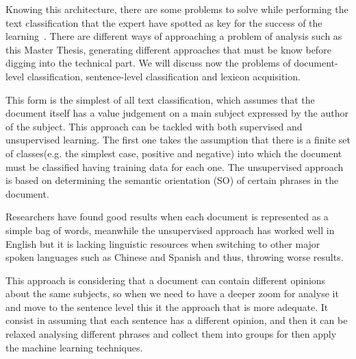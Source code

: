 
Knowing this architecture, there are some problems to solve while performing the text classification that the expert have spotted as key for the success of the learning~\cite{feldman2013techniques}. There are different ways of approaching a problem of analysis such as this Master Thesis, generating different approaches that must be know before digging into the technical part. We will discuss now the problems of document-level classification, sentence-level classification and lexicon acquisition.

This form is the simplest of all text classification, which assumes that the document itself has a value judgement on a main subject expressed by the author of the subject. This approach can be tackled with both supervised and unsupervised learning. The first one takes the assumption that there is a finite set of classes(e.g. the simplest case, positive and negative) into which the document must be classified having training data for each one. The unsupervised approach is based on determining the semantic orientation (SO) of certain phrases in the document.

Researchers have found good results when each document is represented as a simple bag of words, meanwhile the unsupervised approach has worked well in English but it is lacking linguistic resources when switching to other major spoken languages such as Chinese and Spanish and thus, throwing worse results.

This approach is considering that a document can contain different opinions about the same subjects, so when we need to have a deeper zoom for analyse it and move to the sentence level this it the approach that is more adequate. It consist in assuming that each sentence has a different opinion, and then it can be relaxed analysing different phrases and collect them into groups for then apply the machine learning techniques.



